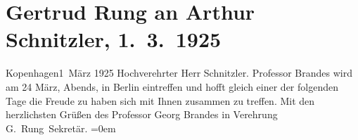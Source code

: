 

         
         \renewcommand{\erwaehntePersonen}{Personen: Georg Brandes}
         \renewcommand{\erwaehnteOrte}{Orte: Berlin, Kopenhagen, Wien}
         \renewcommand{\erwaehnteWerke}{}
               \section[Gertrud Rung an Arthur Schnitzler, 1. 3. 1925]{ Gertrud Rung an Arthur Schnitzler, 1. 3. 1925}\nopagebreak{}\rehead{ }\begin{ledgroupsized}[t]{13cm}\normalsize\beginnumbering \toendnotes[C]{\smallbreak\pagebreak[2]} 
\pstart
           \centering{}{\pb}Kopenhagen1 März 1925\pend
           \pstart{}Hochverehrter Herr Schnitzler.\pend\pstart
           Professor Brandes wird am 24
               März, Abends, in Berlin
               eintreffen und hofft gleich einer der folgenden Tage die Freude zu haben sich mit
               Ihnen zusammen zu treffen.\pend
           \pstart
           Mit den herzlichsten Grüßen des Professor Georg Brandes in Verehrung{\\[\baselineskip]}\spacefill\mbox{G. Rung Sekretär.}\pend
           \leftskip=0em{}
         
         \endnumbering{}\end{ledgroupsized}  \newcommand{\dateiname}{L02435}\newcommand{\titel}{Gertrud Rung an Arthur Schnitzler, 1. 3. 1925}\newcommand{\editorInnen}{Martin Anton Müller und Gerd-Hermann Susen}
      